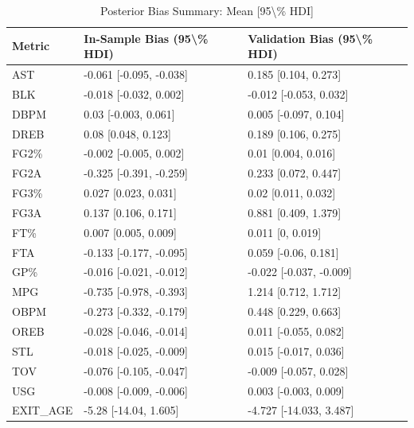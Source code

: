 \begin{table}[t]
\caption*{
{\fontsize{20}{25}\selectfont  Posterior Bias Summary: Mean [95\textbackslash{}\% HDI]\fontsize{12}{15}\selectfont }
} 
\fontsize{12.0pt}{14.0pt}\selectfont
\begin{tabular*}{\linewidth}{@{\extracolsep{\fill}}lll}
\toprule
Metric & In-Sample Bias (95\textbackslash{}\% HDI) & Validation Bias (95\textbackslash{}\% HDI) \\ 
\midrule\addlinespace[2.5pt]
AST & -0.061 [-0.095, -0.038] & 0.185 [0.104, 0.273] \\ 
BLK & -0.018 [-0.032, 0.002] & -0.012 [-0.053, 0.032] \\ 
DBPM & 0.03 [-0.003, 0.061] & 0.005 [-0.097, 0.104] \\ 
DREB & 0.08 [0.048, 0.123] & 0.189 [0.106, 0.275] \\ 
FG2\% & -0.002 [-0.005, 0.002] & 0.01 [0.004, 0.016] \\ 
FG2A & -0.325 [-0.391, -0.259] & 0.233 [0.072, 0.447] \\ 
FG3\% & 0.027 [0.023, 0.031] & 0.02 [0.011, 0.032] \\ 
FG3A & 0.137 [0.106, 0.171] & 0.881 [0.409, 1.379] \\ 
FT\% & 0.007 [0.005, 0.009] & 0.011 [0, 0.019] \\ 
FTA & -0.133 [-0.177, -0.095] & 0.059 [-0.06, 0.181] \\ 
GP\% & -0.016 [-0.021, -0.012] & -0.022 [-0.037, -0.009] \\ 
MPG & -0.735 [-0.978, -0.393] & 1.214 [0.712, 1.712] \\ 
OBPM & -0.273 [-0.332, -0.179] & 0.448 [0.229, 0.663] \\ 
OREB & -0.028 [-0.046, -0.014] & 0.011 [-0.055, 0.082] \\ 
STL & -0.018 [-0.025, -0.009] & 0.015 [-0.017, 0.036] \\ 
TOV & -0.076 [-0.105, -0.047] & -0.009 [-0.057, 0.028] \\ 
USG & -0.008 [-0.009, -0.006] & 0.003 [-0.003, 0.009] \\ 
EXIT\_AGE & -5.28 [-14.04, 1.605] & -4.727 [-14.033, 3.487] \\ 
\bottomrule
\end{tabular*}
\end{table}

